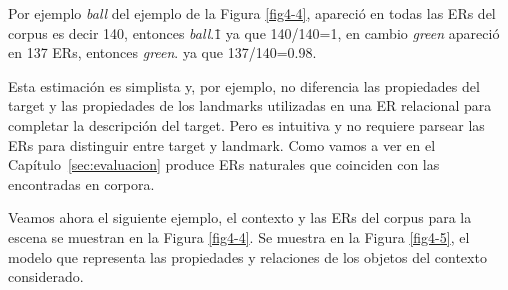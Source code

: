 Por ejemplo {\it ball} del ejemplo de la Figura \ref{fig4-4}, apareci\'o en todas las ERs del corpus es decir 140, entonces {\it ball}.\puse\=1 ya que 140/140=1, en cambio {\it green} apareci\'o en 137 ERs, entonces {\it green}. ya que 137/140=0.98.

Esta estimaci\'on es simplista y, por ejemplo, no 
diferencia las propiedades del target y las propiedades de
los landmarks utilizadas en una ER relacional para completar la descripci\'on
del target. Pero es intuitiva y no requiere parsear las ERs para distinguir entre target y landmark. Como vamos a ver
en el Cap\'itulo~\ref{sec:evaluacion} produce ERs naturales
que coinciden con las encontradas en corpora.

Veamos ahora el siguiente ejemplo, el contexto y las ERs del corpus para la escena se muestran en la Figura \ref{fig4-4}. Se muestra en la Figura \ref{fig4-5}, el modelo que representa 
las propiedades y relaciones de los objetos del contexto considerado.

